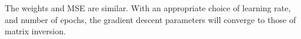 \documentclass{article}
\newcounter{problem}
\newcounter{extraproblem}
\newcommand{\extraquestion}[1]{\refstepcounter{extraproblem}\par\smallskip\textbf{OT\theextraproblem.}\quad #1\par\smallskip}
\begin{document}
The weights and MSE are similar. With an appropriate choice of learning rate, and number of epochs, the gradient descent parameters will converge to those of matrix inversion.
\end{document}
